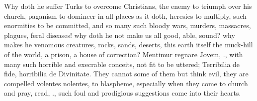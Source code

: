 {Why doth he suffer Turks to overcome Christians, the enemy to triumph
over his church, paganism to domineer in all places as it doth,
heresies to multiply, such enormities to be committed, and so many such
bloody wars, murders, massacres, plagues, feral diseases! why doth he
not make us all good, able, sound? why makes he venomous
creatures, rocks, sands, deserts, this earth itself the muck-hill of
the world, a prison, a house of correction? Mentimur regnare
Jovem, \etc{}., with many such horrible and execrable conceits, not fit to
be uttered; Terribilia de fide, horribilia de Divinitate. They cannot
some of them but think evil, they are compelled volentes nolentes, to
blaspheme, especially when they come to church and pray, read, \etc{}.,
such foul and prodigious suggestions come into their hearts.

}
